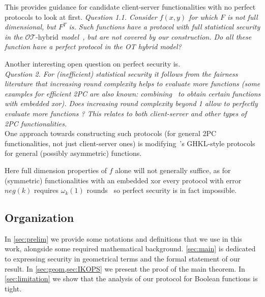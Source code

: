 \documentclass{llncs}
\newcommand{\OTfunc}{\mathcal{OT}}
\newcommand{\OThybrid}{\OTfunc\mbox{-}\text{hybrid}}
\begin{document}
{This provides guidance for candidate client-server functionalities  
with no perfect protocols to look at first.
\emph{Question 1.1.
Consider $f(x,y)$ for which $F$ is not full dimensional, but $F^T$ is.
Such functions have a protocol with full statistical security in the $\OThybrid$ model~\cite{Ash14}, but are not covered by our construction. Do all these function have a perfect protocol in the OT hybrid model? 
}


Another interesting open question on perfect security is.\\ 

\emph{Question 2. For (inefficient) statistical security it follows from the fairness literature that increasing round complexity helps to evaluate more functions (some examples for efficient 2PC are also known: combining~\cite{Ash14,GHKL08} to obtain certain functions with embedded xor).
Does increasing round complexity beyond 1 allow to perfectly evaluate more functions ? This relates to both client-server and other types of 2PC functionalities.} \\

One approach towards constructing such protocols (for general 2PC functionalities, not just client-server ones) is modifying~\cite{Ash14}'s GHKL-style protocols for general (possibly asymmetric) functions. 

Here full dimension properties of $f$ alone will not generally suffice, as for (symmetric) functionalities with an embedded xor every protocol with error $neg(k)$ requires $\omega_k(1)$ rounds~\cite{GHKL08} so perfect security is in fact impossible.
}


\subsection{Organization} In \cref{sec:prelim} we provide some notations and definitions that we use in this work, alongside some required mathematical background. \cref{sec:main} is dedicated to expressing security in geometrical terms and the formal statement of our result. In \cref{sec:geom,sec:IKOPS} we present the proof of the main theorem. In \cref{sec:limitation} we show that the analysis of our protocol for Boolean functions is tight.
\end{document}
